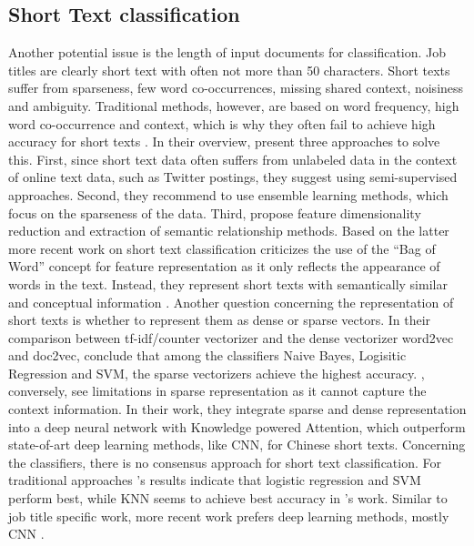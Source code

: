 \documentclass[12pt, a4paper, titlepage]{article}
\begin{document}
\subsection{Short Text classification} 
Another potential issue is the length of input documents for classification. Job titles are clearly short text with often not more than 50 characters. Short texts suffer from sparseness, few word co-occurrences, missing shared context, noisiness and ambiguity. Traditional methods, however, are based on word frequency, high word co-occurrence and context, which is why they often fail to achieve high accuracy for short texts \citep{Song2014, WangY2017, WangF2014}. In their overview, \cite{Song2014} present three approaches to solve this. First, since short text data often suffers from unlabeled data in the context of online text data, such as Twitter postings, they suggest using semi-supervised approaches. Second, they recommend to use ensemble learning methods, which focus on the sparseness of the data. Third, \cite{Song2014} propose feature dimensionality reduction and extraction of semantic relationship methods. Based on the latter more recent work on short text classification criticizes the use of the ``Bag of Word'' concept for feature representation as it only reflects the appearance of words in the text. Instead, they represent short texts with semantically similar and conceptual information \citep{Bouaziz2014, WangF2014, Chen2019}.
Another question concerning the representation of short texts is whether to represent them as dense or sparse vectors. In their comparison between tf-idf/counter vectorizer and the dense vectorizer word2vec and doc2vec, \cite{WangY2017} conclude that among the classifiers Naive Bayes, Logisitic Regression and SVM, the sparse vectorizers achieve the highest accuracy. \cite{Chen2019}, conversely, see limitations in sparse representation as it cannot capture the context information. In their work, they integrate sparse and dense representation into a deep neural network with Knowledge powered Attention, which outperform state-of-art deep learning methods, like CNN, for Chinese short texts. 
Concerning the classifiers, there is no consensus approach for short text classification. For traditional approaches \cite{WangY2017}'s results indicate that logistic regression and SVM perform best, while KNN seems to achieve best accuracy in \cite{Khamar2013}'s work. Similar to job title specific work, more recent work prefers deep learning methods, mostly CNN \citep{Chen2019}. 
\end{document}
